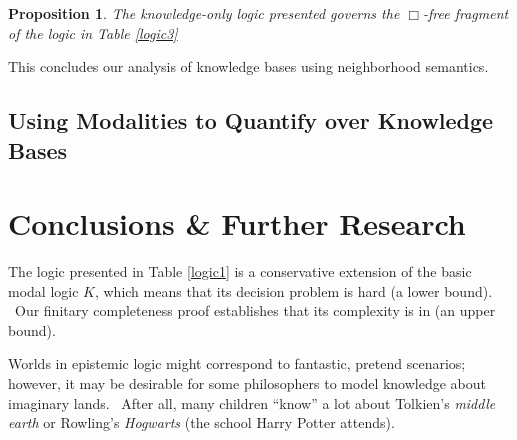 \documentclass{acmconf}
\newcommand{\tmem}[1]{{\em #1\/}}
\newcommand{\tmtextsf}[1]{{\sffamily{#1}}}
\newtheorem{proposition}{Proposition}
\begin{document}
\begin{proposition}
  The knowledge-only logic presented governs the $\Box$-free fragment of the
  logic in Table \ref{logic3}
\end{proposition}

This concludes our analysis of knowledge bases using neighborhood semantics.

\subsection{\label{quantifying}Using Modalities to Quantify over Knowledge
Bases}

\section{Conclusions \& Further Research}

The logic presented in Table \ref{logic1} is a conservative extension of the
basic modal logic $K$, which means that its decision problem is
\tmtextsf{PSPACE} hard (a lower bound). \ Our finitary completeness proof
establishes that its complexity is in \tmtextsf{EXP2-TIME} (an upper bound).



Worlds in epistemic logic might correspond to fantastic, pretend scenarios;
however, it may be desirable for some philosophers to model knowledge about
imaginary lands. \ After all, many children ``know'' a lot about Tolkien's
{\tmem{middle earth}} or Rowling's {\tmem{Hogwarts}} (the school Harry Potter
attends).
\end{document}
